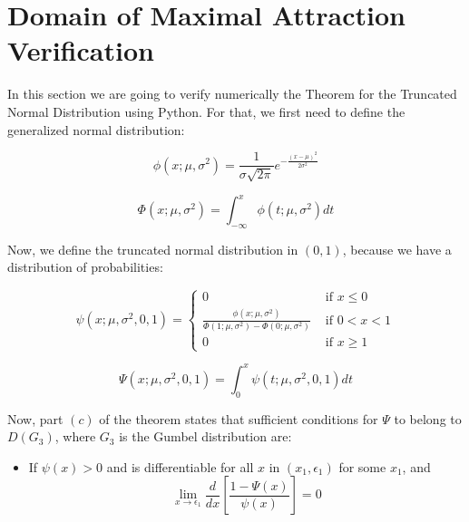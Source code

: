 \chapter{Domain of Maximal Attraction Verification}
\label{ap:theoremVer}

In this section we are going to verify numerically the Theorem for the Truncated Normal Distribution using Python. For that, we first need to define the generalized normal distribution:

\begin{equation} \label{eq:Normal_PDF}
\phi (x; \mu, \sigma^2) = \frac{1}{\sigma \sqrt{2 \pi}} e^{-\frac{\left( x - \mu \right)^2}{2\sigma^2}}
\end{equation}

\begin{equation} \label{eq:Normal_CDF}
\Phi (x; \mu, \sigma^2) = \int_{-\infty} ^x \phi (t;\mu,\sigma^2) dt
\end{equation}

Now, we define the truncated normal distribution in $(0,1)$, because we have a distribution of probabilities:

\begin{equation} \label{eq:TNormal_PDF}
\psi (x; \mu, \sigma^2,0,1) = 
\begin{cases}
0 & \text{ if } x \leq 0 \\
\frac{\phi(x;\mu, \sigma^2)}{\Phi (1; \mu, \sigma^2)-\Phi (0; \mu, \sigma^2)} & \text{ if } 0 < x < 1 \\
0 & \text{ if } x \geq 1
\end{cases}
\end{equation}

\begin{equation} \label{eq:TNormal_CDF}
\Psi (x; \mu, \sigma^2,0,1) = \int_{0} ^x \psi (t;\mu,\sigma^2,0,1) dt
\end{equation}

Now, part $(c)$ of the theorem states that sufficient conditions for $\Psi$ to belong to $D(G_3)$, where $G_3$ is the Gumbel distribution are:

\begin{itemize}
\item If $\psi(x) >0$ and is differentiable for all $x$ in $(x_1,\epsilon_1)$ for some $x_1$, and
\begin{equation} \label{eq:partC_theorem}
\lim_{x \rightarrow \epsilon_1} \frac{d}{dx} \left[ \frac{1-\Psi(x)}{\psi(x)} \right] = 0
\end{equation}
\end{itemize}

